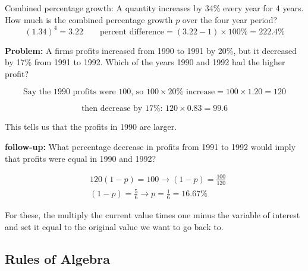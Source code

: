 \documentclass[12pt]{article}
\begin{document}
Combined percentage growth: A quantity increases by 34\% every year for 4 years. How much is the combined percentage growth $p$ over the four year period?
\begin{equation*}
    (1.34)^4=3.22 \quad \quad \text{percent difference} = (3.22 -1) \times 100\%=222.4\%
\end{equation*}

\textbf{Problem: }A firms profits increased from 1990 to 1991 by 20\%, but it decreased by 17\% from 1991 to 1992. Which of the years 1990 and 1992 had the higher profit? \vspace{-40pt}

\begin{equation*}
    \text{Say the 1990 profits were 100, so } 100 \times 20\% \text{ increase}= 100 \times 1.20=120
\end{equation*}\vspace{-60pt}

\begin{equation*}
    \text{then decrease by 17\%: } 120\times 0.83 = 99.6 
\end{equation*}

This tells us that the profits in 1990 are larger.

\textbf{follow-up: } What percentage decrease in profits from 1991 to 1992 would imply that profits were equal in 1990 and 1992? \vspace{-30pt}

\begin{align*}
    &120(1-p)=100 \rightarrow (1-p)=\frac{100}{120}\\
    &(1-p)= \frac{5}{6} \rightarrow p=\frac{1}{6}=16.67\%
\end{align*}

For these, the multiply the current value times one minus the variable of interest and set it equal to the original value we want to go back to.

\subsection{Rules of Algebra}
\end{document}
